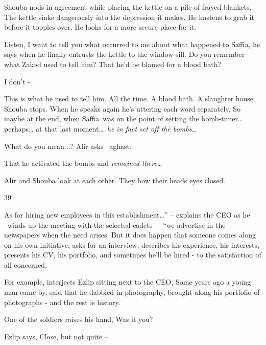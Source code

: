 \documentclass[letterpaper]{article}
\begin{document}
Shouba nods in agreement while placing the kettle on a pile of frayed blankets. The kettle sinks dangerously into the
depression it makes. He hastens to grab it before it topples over. He looks for a more secure place for it. 

{\textquotedbl}Listen, I want to tell you what occurred to me about what happened to Saffia,{\textquotedbl} he says when
he finally entrusts the kettle to the window sill. {\textquotedbl}Do you remember what Zakod used to tell him? That
he'd be blamed for a blood bath?{\textquotedbl} 

{\textquotedbl}I don't -{\textquotedbl} 

{\textquotedbl}This is what he used to tell him. All the time. A blood bath. A slaughter house.{\textquotedbl} Shouba
stops. When he speaks again he's uttering each word separately, {\textquotedbl}So maybe at the end, when Saffia~was on
the point of setting the bomb-timer{\dots} perhaps{\dots} at that last moment{\dots}~\textit{he in fact set off the
bombs}{\dots}{\textquotedbl} 

{\textquotedbl}What do you mean...?{\textquotedbl} Alir asks \ aghast.

{\textquotedbl}That he activated the bombs and \textit{remained there}{\dots}{\textquotedbl}

Alir and Shouba look at each other. They bow their heads eyes closed. 


\bigskip

39~~~~~~~~~~~~~~~~~~~ 

{\textquotedbl}As for hiring new employees in this establishment{\dots}'' -- explains the CEO as he \ winds up the
meeting with the selected cadets - \ {}``we advertise in the newspapers when the need arises. But it does happen that
someone comes along on his own initiative, asks for an interview, describes his experience, his interests, presents his
CV, his portfolio, and sometimes he'll be hired - to the satisfaction of all concerned.{\textquotedbl} 

{\textquotedbl}For example,{\textquotedbl} interjects Ezlip sitting next to the CEO, {\textquotedbl}Some years ago a
young man came by, said that he dabbled in photography, brought along his portfolio of photographs - and the rest is
history.{\textquotedbl} 

One of the soldiers raises his hand, {\textquotedbl}Was it you?{\textquotedbl} \ 

Ezlip says, {\textquotedbl}Close, but not quite --{\textquotedbl} 
\end{document}
